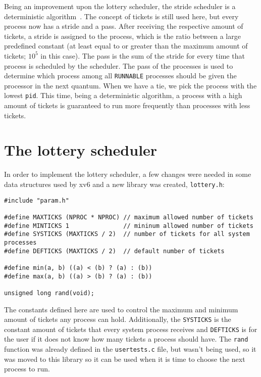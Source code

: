 \documentclass[12pt]{article}
\begin{document}
Being an improvement upon the lottery scheduler, the stride scheduler is a deterministic algorithm~\cite{waldspurger:95}. The concept of tickets is still used here, but every process now has a stride and a pass. After receiving the respective amount of tickets, a stride is assigned to the process, which is the ratio between a large predefined constant (at least equal to or greater than the maximum amount of tickets; $10^{5}$ in this case). The pass is the sum of the stride for every time that process is scheduled by the scheduler. The pass of the processes is used to determine which process among all \texttt{RUNNABLE} processes should be given the processor in the next quantum. When we have a tie, we pick the process with the lowest \texttt{pid}. This time, being a deterministic algorithm, a process with a high amount of tickets is guaranteed to run more frequently than processes with less tickets.

\section{The lottery scheduler}\label{sec:lottsched}
In order to implement the lottery scheduler, a few changes were needed in
some data structures used by xv6 and a new library was created, \texttt{lottery.h}:

\begin{scriptsize}
\begin{verbatim}
#include "param.h"

#define MAXTICKS (NPROC * NPROC) // maximum allowed number of tickets
#define MINTICKS 1               // mininum allowed number of tickets
#define SYSTICKS (MAXTICKS / 2)  // number of tickets for all system processes
#define DEFTICKS (MAXTICKS / 2)  // default number of tickets

#define min(a, b) ((a) < (b) ? (a) : (b))
#define max(a, b) ((a) > (b) ? (a) : (b))

unsigned long rand(void);
\end{verbatim}
\end{scriptsize}

The constants defined here are used to control the maximum and minimum amount of tickets any process can hold. Additionally, the \texttt{SYSTICKS} is the constant amount of tickets that every system process receives and \texttt{DEFTICKS} is for the user if it does not know how many tickets a process should have. The \texttt{rand} function was already defined in the \texttt{usertests.c} file, but wasn't being used, so it was moved to this library so it can be used when it is time to choose the next process to run.
\end{document}
